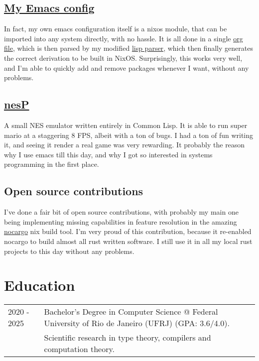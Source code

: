 \documentclass[twocolumn,a4paper,12pt]{article}
\begin{document}
\subsection*{\href{https://github.com/o-santi/emacs}{\textbf{My Emacs config}}}
In fact, my own emacs configuration itself is a nixos module, that can be imported into any system directly, with no hassle. It is all done in a single \href{https://orgmode.org/}{org file}, which is then parsed by my modified \href{https://github.com/o-santi/from-elisp}{lisp parser}, which then finally generates the correct derivation to be built in NixOS. Surprisingly, this works very well, and I'm able to quickly add and remove packages whenever I want, without any problems.

\subsection*{\href{https://github.com/o-santi/nesp}{\textbf{nesP}}}
A small NES emulator written entirely in Common Lisp. It is able to run super mario at a staggering 8 FPS, albeit with a ton of bugs. I had a ton of fun writing it, and seeing it render a real game was very rewarding. It probably the reason why I use emacs till this day, and why I got so interested in systems programming in the first place.

\subsection*{Open source contributions}
I've done a fair bit of open source contributions, with probably my main one being implementing missing capabilities in feature resolution in the amazing \href{https://github.com/o-santi/nocargo}{nocargo} nix build tool. I'm very proud of this contribution, because it re-enabled nocargo to build almost all rust written software. I still use it in all my local rust projects to this day without any problems.

\section{Education}
\begin{tabularx}{\linewidth}{ @{}l X@{} }	

  2020 - 2025 & Bachelor's Degree in Computer Science @ Federal University of Rio de Janeiro (UFRJ) (GPA: 3.6/4.0). \\
  & Scientific research in type theory, compilers and computation theory.

\end{tabularx}
\end{document}
